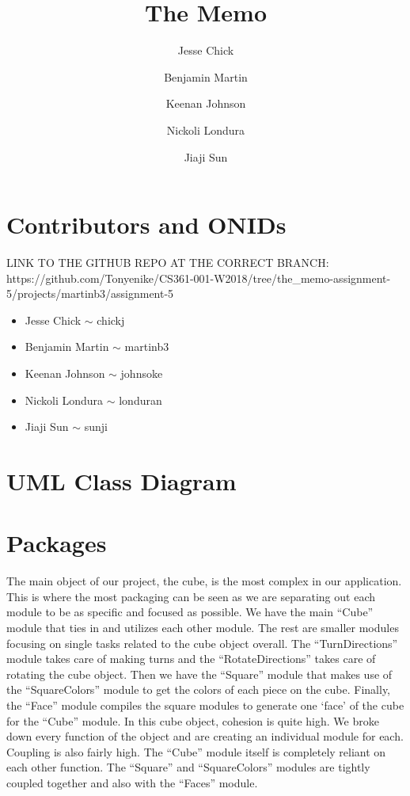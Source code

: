 \documentclass[12pt]{article}
\title{The Memo}
\author{Jesse Chick\\
\and Benjamin Martin\\
\and Keenan Johnson\\
\and Nickoli Londura\\
\and Jiaji Sun}
\begin{document}
\maketitle
\tableofcontents

\section{Contributors and ONIDs}
\par
LINK TO THE GITHUB REPO AT THE CORRECT BRANCH: https://github.com/Tonyenike/CS361-001-W2018/tree/the\_memo-assignment-5/projects/martinb3/assignment-5

\begin{itemize}
	\item Jesse Chick $\sim$ chickj
	\item Benjamin Martin $\sim$ martinb3
	\item Keenan Johnson $\sim$ johnsoke
	\item Nickoli Londura $\sim$ londuran
	\item Jiaji Sun $\sim$ sunji
\end{itemize}

\section{UML Class Diagram}
	

\section{Packages}

\par
The main object of our project, the cube, is the most complex  in our application. This is where the most packaging can be seen as we are separating out each module to be as specific and focused as possible. We have the main “Cube” module that ties in and utilizes each other module. The rest are smaller modules focusing on single tasks related to the cube object overall. The “TurnDirections” module takes care of making turns and the “RotateDirections” takes care of rotating the cube object. Then we have the “Square” module that makes use of the “SquareColors” module to get the colors of each piece on the cube. Finally, the “Face” module compiles the square modules to generate one ‘face’ of the cube for the “Cube” module. In this cube object, cohesion is quite high. We broke down every function of the object and are creating an individual module for each. Coupling is also fairly high. The “Cube” module itself is completely reliant on each other function. The “Square” and “SquareColors” modules are tightly coupled together and also with the “Faces” module. \\
\end{document}
